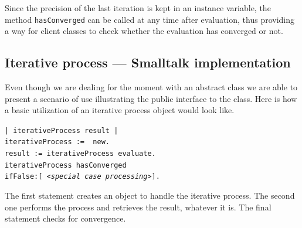 \documentclass[twoside]{book}
\begin{document}
Since the precision of the last iteration is kept in an instance
variable, the method {\tt hasConverged} can be called at any time
after evaluation, thus providing a way for client classes to check
whether the evaluation has converged or not.

\subsection{Iterative process --- Smalltalk implementation}
\label{sec:siteration}
Even though we are dealing for the moment
with an abstract class we are able to present a scenario of use
illustrating the public interface to the class. Here is how a
basic utilization of an iterative process object would look like.
\begin{codeExample}\hfil\break
{\tt | iterativeProcess result |\\
 iterativeProcess := {\sl <a subclass of DhbIterativeProcess>}
 new.\\
result := iterativeProcess evaluate.\\ iterativeProcess
hasConverged\\ \hspace{4 em} ifFalse:[ {\sl <special case
processing>}].
 }
\end{codeExample}
The first statement creates an object to handle the iterative
process. The second one performs the process and retrieves the
result, whatever it is. The final statement checks for
convergence.
\end{document}
